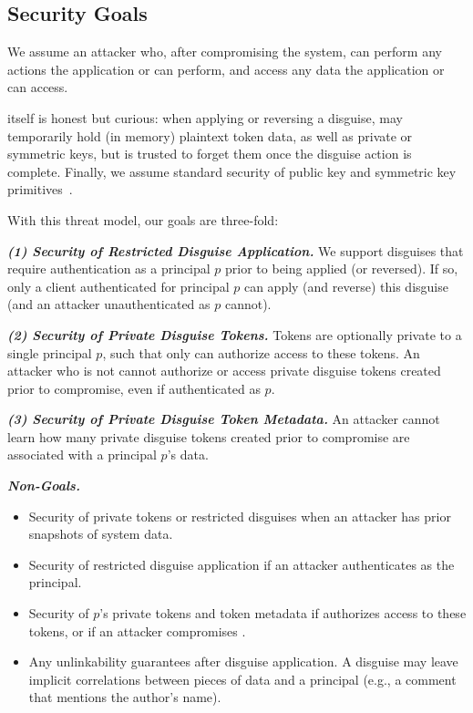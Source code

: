 \subsection{Security Goals}
We assume an attacker who, after compromising the system, can perform any actions the
application or \sys can perform, and access any data the application or \sys can access.

\sys itself is honest but curious: when applying or reversing a disguise, \sys may temporarily
hold (in memory) plaintext token data, as well as private or symmetric keys, but is trusted to
forget them once the disguise action is complete. 
Finally, we assume standard security of public key and symmetric key primitives~.

With this threat model, our goals are three-fold: 

\vspace{6pt}\noindent\textbf{\emph{(1) Security of Restricted Disguise Application.}}
We support disguises that require authentication as a principal $p$ prior to being
applied (or reversed). If so, only a client authenticated for principal $p$ can apply (and reverse) this disguise (and an attacker unauthenticated as $p$ cannot).

\vspace{6pt}\noindent\textbf{\emph{(2) Security of Private Disguise Tokens.} }
Tokens are optionally private to a single principal $p$, such that only  can authorize
access to these tokens. An attacker who is not  cannot
authorize or access private disguise tokens created prior to compromise, even if authenticated as $p$.

\vspace{6pt}\noindent\textbf{\emph{(3) Security of Private Disguise Token Metadata.}}
An attacker cannot learn how many private disguise tokens created prior to compromise are associated with a principal $p$'s data.

\vspace{6pt}\noindent\textbf{\emph{Non-Goals.}}
\begin{itemize}
    \item Security of private tokens or restricted disguises when an attacker has prior snapshots of system data.
    \item Security of restricted disguise application if an attacker authenticates as the principal.
    \item Security of $p$'s private tokens and token metadata if  authorizes access to these
        tokens, or if an attacker compromises .
    \item Any unlinkability guarantees after disguise application. A disguise may leave implicit
        correlations between pieces of data and a principal (e.g., a comment that mentions the author’s name).
\end{itemize}

